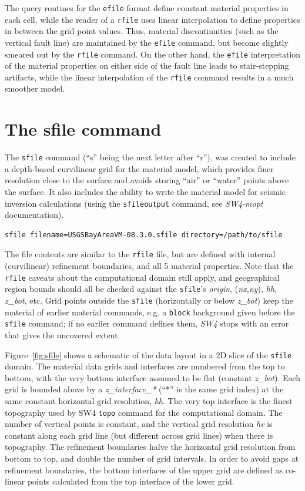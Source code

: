 \documentclass[11pt]{report}
\begin{document}
{The query routines for the {\tt efile} format define constant material properties in each cell,
while the reader of a {\tt rfile} uses linear interpolation to define properties in between the grid
point values. Thus, material discontinuities (such as the vertical fault line) are maintained by
the {\tt efile} command, but become slightly smeared out by the {\tt rfile} command. On the other
hand, the {\tt efile} interpretation of the material properties on either side of the fault line
leads to stair-stepping artifacts, while the linear interpolation of the {\tt rfile} command results
in a much smoother model.

\section{The sfile command} \label{sec:sfile-mat}
The \verb+sfile+ command (``s'' being the next letter after ``r''), was created to include a depth-based curvilinear grid for the material model,  which provides finer resolution close to the surface and avoids storing ``air'' or ``water'' points above the surface. It also includes the ability to write the material model for seismic inversion calculations (using the \verb+sfileoutput+ command, see {\em SW4-mopt} documentation).

\begin{verbatim}
sfile filename=USGSBayAreaVM-08.3.0.sfile directory=/path/to/sfile
\end{verbatim}

The file contents are similar to the \verb+rfile+ file, but are defined with internal (curvilinear) refinement boundaries, and all 5 material properties. Note that the \verb+rfile+ caveats about the computational domain still apply, and geographical region bounds should all be checked against the \verb+sfile+'s {\em origin}, ({\em nx,ny}), {\em hh}, {\em z\_bot}, etc.
Grid points outside the \verb+sfile+ (horizontally or below {\em z\_bot}) keep the material of earlier material
commands, e.g. a \verb+block+ background given before the \verb+sfile+ command; if no earlier command defines them,
\emph{SW4} stops with an error that gives the uncovered extent.

Figure~\ref{fig:sfile} shows a schematic of the data layout in a 2D slice
of the \verb+sfile+ domain.
The material data grids and interfaces are numbered from the top to bottom,
with the very bottom interface assumed to be flat (constant {\em z\_bot}).
Each grid is bounded above by a {\em z\_interface\_*} (``*'' is the same
grid index) at the same constant horizontal grid resolution, {\em hh}.
The very top interface is the finest topography used by SW4
\verb+topo+ command for the computational domain.
The number of vertical points is constant, and the vertical grid resolution
	{\em hv} is constant along each grid line (but different across grid lines)
when there is topography.
The refinement boundaries halve the horizontal grid resolution from bottom
to top, and double the number of grid intervals.
In order to avoid gaps at refinement boundaries, the bottom interfaces
of the upper grid are defined as co-linear points calculated from the top
interface of the lower grid.

}
\end{document}
